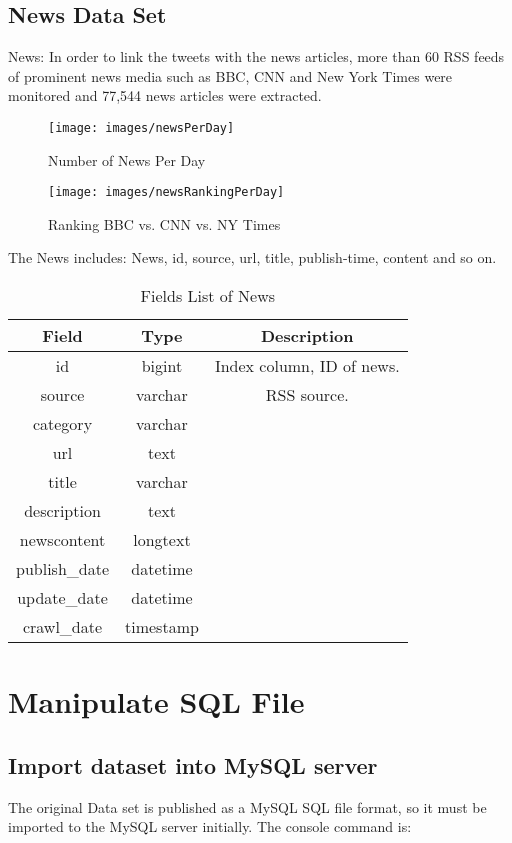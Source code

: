 \subsection{News Data Set}
News: In order to link the tweets with the news articles, more than 60 RSS feeds of prominent news media such as BBC, CNN and New York Times were monitored and 77,544 news articles were extracted.

\newpage
\begin{figure}[ht]
	\centering
	\texttt{[image: images/newsPerDay]}
	\caption{Number of News Per Day}
	\label{NrNersPerDay}
\end{figure}

\newpage
\begin{figure}[ht]
	\centering
	\texttt{[image: images/newsRankingPerDay]}
	\caption{Ranking BBC vs. CNN vs. NY Times}
	\label{newsRankingPerDay}
\end{figure}

\newpage
The News includes: News, id, source, url, title, publish-time, content and so on.
\begin{table}[h]
	\begin{longtable}{|c|c|c|}
		\hline \textbf{Field} & \textbf{Type} & \textbf{Description} \\ 
		\hline\hline id & bigint & Index column, ID of news. \\ 
		\hline source & varchar & RSS source. \\ 
		\hline category & varchar &  \\ 
		\hline url & text &  \\ 
		\hline title & varchar &  \\ 
		\hline description & text &  \\ 
		\hline newscontent & longtext &  \\ 
		\hline publish\_date & datetime &  \\ 
		\hline update\_date & datetime &  \\ 
		\hline crawl\_date & timestamp &  \\ 
		\hline 
	\end{longtable}
	\caption{Fields List of News} 
\end{table}
 
\section{Manipulate SQL File}
\subsection{Import dataset into MySQL server}
The original Data set is published as a MySQL SQL file format, so it must be imported to the MySQL server initially. The console command is:

